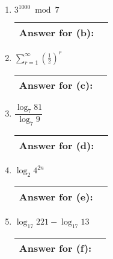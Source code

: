 \documentclass[11pt]{article}
\begin{document}
\begin{problems}
\begin{enumerate}
\item $3^{1000} \bmod 7$ 
\vspace{1.5in}
\begin{table}[!h] \flushright \renewcommand{\arraystretch}{2}  \begin{tabular}{|l|c| } \hline
Answer for (b): & \hspace{2in} \\
\hline \end{tabular} \end{table}

\item $\displaystyle\sum_{r=1}^\infty(\frac{1}{2})^r$
\vspace{1.25in}
\begin{table}[!h] \flushright \renewcommand{\arraystretch}{2}  \begin{tabular}{|l|c| } \hline
Answer for (c): & \hspace{2in} \\
\hline \end{tabular} \end{table}

\newpage
\item $\dfrac{\log_7 81}{\log_7 9}$ 
\vspace{1in}
\begin{table}[!h] \flushright \renewcommand{\arraystretch}{2}  \begin{tabular}{|l|c| } \hline
Answer for (d): & \hspace{2in} \\
\hline \end{tabular} \end{table}

\item $\log_2 4^{2n}$  
\vspace{1in}
\begin{table}[!h] \flushright \renewcommand{\arraystretch}{2}  \begin{tabular}{|l|c| } \hline
Answer for (e): & \hspace{2in} \\
\hline \end{tabular} \end{table}

\item $\log_{17} 221 - \log_{17} 13$ 
\vspace{1in}
\begin{table}[!h] \flushright \renewcommand{\arraystretch}{2}  \begin{tabular}{|l|c| } \hline
Answer for (f): & \hspace{2in} \\
\hline \end{tabular} \end{table}
\end{enumerate}


\end{problems}
\end{document}
